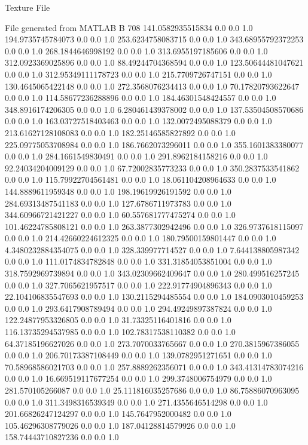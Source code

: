 Texture File 

File generated from MATLAB 
B 708
141.0582935515834	0.0	0.0	1.0
194.9735745784073	0.0	0.0	1.0
253.6234758083715	0.0	0.0	1.0
343.68955792372253	0.0	0.0	1.0
268.1844646998192	0.0	0.0	1.0
313.6955197185606	0.0	0.0	1.0
312.0923369025896	0.0	0.0	1.0
88.49244704368594	0.0	0.0	1.0
123.50644481047621	0.0	0.0	1.0
312.95349111178723	0.0	0.0	1.0
215.7709726747151	0.0	0.0	1.0
130.4645065422148	0.0	0.0	1.0
272.3568076234413	0.0	0.0	1.0
70.17820793622647	0.0	0.0	1.0
114.58677236288896	0.0	0.0	1.0
184.46301548424557	0.0	0.0	1.0
348.8916174206305	0.0	0.0	1.0
6.280461439378002	0.0	0.0	1.0
137.53504508570686	0.0	0.0	1.0
163.03727518403463	0.0	0.0	1.0
132.0072495088379	0.0	0.0	1.0
213.61627128108083	0.0	0.0	1.0
182.25146585827892	0.0	0.0	1.0
225.09775053708984	0.0	0.0	1.0
186.7662073296011	0.0	0.0	1.0
355.1601383380077	0.0	0.0	1.0
284.1661549830491	0.0	0.0	1.0
291.8962184158216	0.0	0.0	1.0
92.24034204009129	0.0	0.0	1.0
67.72002835773233	0.0	0.0	1.0
350.2837533541862	0.0	0.0	1.0
115.79922704561481	0.0	0.0	1.0
18.061104208964633	0.0	0.0	1.0
144.8889611959348	0.0	0.0	1.0
198.19619926191592	0.0	0.0	1.0
284.69313487541183	0.0	0.0	1.0
127.6786711973783	0.0	0.0	1.0
344.60966721421227	0.0	0.0	1.0
60.557681777475274	0.0	0.0	1.0
101.46224785808121	0.0	0.0	1.0
263.3877302942496	0.0	0.0	1.0
326.9737618115097	0.0	0.0	1.0
214.42660224612325	0.0	0.0	1.0
180.79500159801447	0.0	0.0	1.0
4.3480232884354075	0.0	0.0	1.0
328.339977714527	0.0	0.0	1.0
7.644138805987342	0.0	0.0	1.0
111.0174834782848	0.0	0.0	1.0
331.31854053851004	0.0	0.0	1.0
318.7592969739894	0.0	0.0	1.0
343.02309662409647	0.0	0.0	1.0
280.499516257245	0.0	0.0	1.0
327.7065621957517	0.0	0.0	1.0
222.91774904896343	0.0	0.0	1.0
22.104106835547693	0.0	0.0	1.0
130.2115294485554	0.0	0.0	1.0
184.0903010459253	0.0	0.0	1.0
293.6417908789494	0.0	0.0	1.0
294.49249897387824	0.0	0.0	1.0
122.24877953326805	0.0	0.0	1.0
31.73325116401816	0.0	0.0	1.0
116.13735294537985	0.0	0.0	1.0
102.78317538110382	0.0	0.0	1.0
64.37185196627026	0.0	0.0	1.0
273.7070033765667	0.0	0.0	1.0
270.3815967386055	0.0	0.0	1.0
206.70173387108449	0.0	0.0	1.0
139.0782951271651	0.0	0.0	1.0
70.58968586021703	0.0	0.0	1.0
257.8889262356071	0.0	0.0	1.0
343.41314783074216	0.0	0.0	1.0
16.669519117677254	0.0	0.0	1.0
299.3748006754979	0.0	0.0	1.0
281.570105266087	0.0	0.0	1.0
25.111816035257686	0.0	0.0	1.0
86.75886070963095	0.0	0.0	1.0
311.3498316539349	0.0	0.0	1.0
271.4355646514298	0.0	0.0	1.0
201.66826247124297	0.0	0.0	1.0
145.7647952000482	0.0	0.0	1.0
105.46296308779026	0.0	0.0	1.0
187.04128814579926	0.0	0.0	1.0
158.74443710827236	0.0	0.0	1.0
